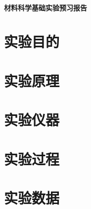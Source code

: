 \documentclass[a4paper,utf8]{article}
\begin{document}
\begin{center}
    {\mbox{}\\[7em]\bfseries\songti%
    材料科学基础实验预习报告}\\[34mm]
\end{center}
\newpage
\section{实验目的}
\section{实验原理}%
\section{实验仪器}%
\section{实验过程}%
\section{实验数据}
\end{document}
